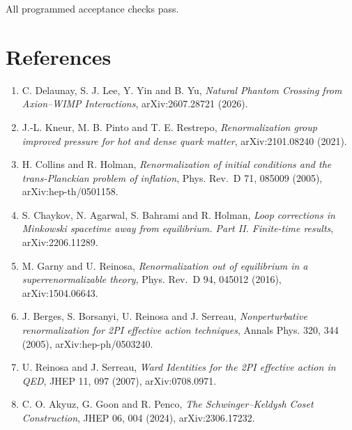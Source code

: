 \documentclass[
  10pt,
  a4paper,
]{article}
\providecommand{\tightlist}{%
  \setlength{\itemsep}{0pt}\setlength{\parskip}{0pt}}
\begin{document}
All programmed acceptance checks pass.

\section{References}\label{references}

\begin{enumerate}
\def\labelenumi{\arabic{enumi}.}
\tightlist
\item
  C. Delaunay, S. J. Lee, Y. Yin and B. Yu, \emph{Natural Phantom
  Crossing from Axion--WIMP Interactions}, arXiv:2607.28721 (2026).
\item
  J.-L. Kneur, M. B. Pinto and T. E. Restrepo, \emph{Renormalization
  group improved pressure for hot and dense quark matter},
  arXiv:2101.08240 (2021).
\item
  H. Collins and R. Holman, \emph{Renormalization of initial conditions
  and the trans-Planckian problem of inflation}, Phys. Rev.~D 71, 085009
  (2005), arXiv:hep-th/0501158.
\item
  S. Chaykov, N. Agarwal, S. Bahrami and R. Holman, \emph{Loop
  corrections in Minkowski spacetime away from equilibrium. Part II.
  Finite-time results}, arXiv:2206.11289.
\item
  M. Garny and U. Reinosa, \emph{Renormalization out of equilibrium in a
  superrenormalizable theory}, Phys. Rev.~D 94, 045012 (2016),
  arXiv:1504.06643.
\item
  J. Berges, S. Borsanyi, U. Reinosa and J. Serreau,
  \emph{Nonperturbative renormalization for 2PI effective action
  techniques}, Annals Phys. 320, 344 (2005), arXiv:hep-ph/0503240.
\item
  U. Reinosa and J. Serreau, \emph{Ward Identities for the 2PI effective
  action in QED}, JHEP 11, 097 (2007), arXiv:0708.0971.
\item
  C. O. Akyuz, G. Goon and R. Penco, \emph{The Schwinger--Keldysh Coset
  Construction}, JHEP 06, 004 (2024), arXiv:2306.17232.
\end{enumerate}
\end{document}
